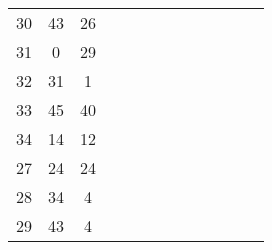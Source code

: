 \begin{table}[tb]
\begin{tabular}{|c|c|c|cccccccccc}
	30 & 43 & 26 &                         &                         &                         &                         &                        &                         &                         &                         &                        &                        \\ \cline{1-3}
	31 & 0  & 29 &                         &                         &                         &                         &                        &                         &                         &                         &                        &                        \\ \cline{1-3}
	32 & 31 & 1  &                         &                         &                         &                         &                        &                         &                         &                         &                        &                        \\ \cline{1-3}
	33 & 45 & 40 &                         &                         &                         &                         &                        &                         &                         &                         &                        &                        \\ \cline{1-3}
	34 & 14 & 12 &                         &                         &                         &                         &                        &                         &                         &                         &                        &                        \\ \cline{1-3}
	27 & 24 & 24 &                         &                         &                         &                         &                        &                         &                         &                         &                        &                        \\ \cline{1-3}
	28 & 34 & 4  &                         &                         &                         &                         &                        &                         &                         &                         &                        &                        \\ \cline{1-3}
	29 & 43 & 4  &                         &                         &                         &                         &                        &                         &                         &                         &                        &                        \\ \cline{1-3}

\end{tabular}
\end{table}
